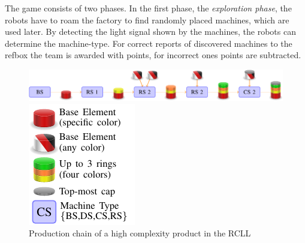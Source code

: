 The game consists of two phases. In the first phase, the
\emph{exploration phase}, the robots have to roam the factory to find
randomly placed machines, which are used later. By detecting the
light signal shown by the machines, the robots can determine the
machine-type. For correct reports of discovered machines to the refbox
the team is awarded with points, for incorrect ones points are subtracted.

\begin{figure}[t]
  \centering
  \begin{minipage}{.8\linewidth}
  \includegraphics[width=\linewidth]{img/chain_c3}%
  \end{minipage}
  \quad%
  \begin{minipage}{.15\linewidth}
  \includegraphics[width=\linewidth]{img/legend}%
  \end{minipage}
  \caption[Production chain of a high complexity
    product in the RCLL]{Production chain of a high complexity
    product in the RCLL}
  \vspace{-2mm}
  \label{fig:prod-chain}
\end{figure}

